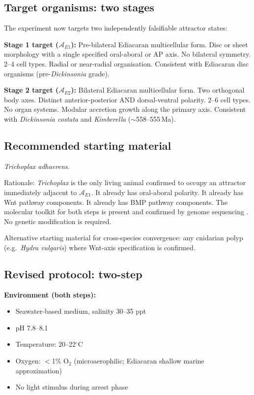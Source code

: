 \documentclass[12pt, a4paper]{article}
\theoremstyle{definition}
\theoremstyle{remark}
\begin{document}
\subsection{Target organisms: two stages}

The experiment now targets two independently falsifiable
attractor states:

\textbf{Stage 1 target ($\mathcal{A}_{E1}$):}
Pre-bilateral Ediacaran multicellular form. Disc or sheet
morphology with a single specified oral-aboral or AP axis.
No bilateral symmetry. 2--4 cell types. Radial or
near-radial organisation. Consistent with Ediacaran disc
organisms (pre-\textit{Dickinsonia} grade).

\textbf{Stage 2 target ($\mathcal{A}_{E2}$):}
Bilateral Ediacaran multicellular form. Two orthogonal
body axes. Distinct anterior-posterior AND
dorsal-ventral polarity. 2--6 cell types. No organ systems.
Modular accretion growth along the primary axis. Consistent
with \textit{Dickinsonia costata} and
\textit{Kimberella} ($\sim$558--555\,Ma).

\subsection{Recommended starting material}

\textit{Trichoplax adhaerens}.

Rationale: \textit{Trichoplax} is the only living animal
confirmed to occupy an attractor immediately adjacent to
$\mathcal{A}_{E1}$. It already has oral-aboral polarity.
It already has Wnt pathway components. It already has BMP
pathway components. The molecular toolkit for both steps
is present and confirmed by genome sequencing
\cite{srivastava2008}. No genetic modification is required.

Alternative starting material for cross-species
convergence: any cnidarian polyp (e.g.\ \textit{Hydra
vulgaris}) where Wnt-axis specification is confirmed.

\subsection{Revised protocol: two-step}

\textbf{Environment (both steps):}
\begin{itemize}[noitemsep]
  \item Seawater-based medium, salinity 30--35 ppt
  \item pH 7.8--8.1
  \item Temperature: 20--22$^\circ$C
  \item Oxygen: $<$1\% O$_2$ (microaerophilic; Ediacaran
        shallow marine approximation)
  \item No light stimulus during arrest phase
\end{itemize}
\end{document}
